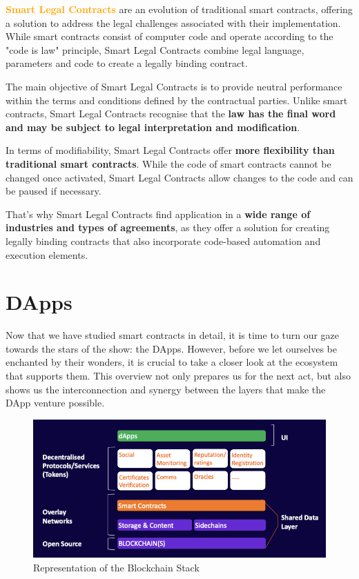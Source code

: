 \textbf{\textcolor{Orange}{Smart Legal Contracts}} are an evolution of traditional smart contracts, offering a solution to address the legal challenges associated with their implementation. While smart contracts consist of computer code and operate according to the "code is law" principle, Smart Legal Contracts combine legal language, parameters and code to create a legally binding contract.

The main objective of Smart Legal Contracts is to provide neutral performance within the terms and conditions defined by the contractual parties. Unlike smart contracts, Smart Legal Contracts recognise that the \textbf{law has the final word and may be subject to legal interpretation and modification}.

In terms of modifiability, Smart Legal Contracts offer \textbf{more flexibility than traditional smart contracts}. While the code of smart contracts cannot be changed once activated, Smart Legal Contracts allow changes to the code and can be paused if necessary.

That's why Smart Legal Contracts find application in a \textbf{wide range of industries and types of agreements}, as they offer a solution for creating legally binding contracts that also incorporate code-based automation and execution elements.

\section{DApps}

Now that we have studied smart contracts in detail, it is time to turn our gaze towards the stars of the show: the DApps. However, before we let ourselves be enchanted by their wonders, it is crucial to take a closer look at the ecosystem that supports them. This overview not only prepares us for the next act, but also shows us the interconnection and synergy between the layers that make the DApp venture possible. 

\begin{figure}[!htbp]
\centering\includegraphics[scale=0.75]{tikz/chapter4 - Blockchain Stack.png}
\caption{Representation of the Blockchain Stack}
\end{figure}

